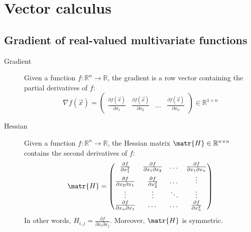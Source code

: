 \chapter{Vector calculus}


\section{Gradient of real-valued multivariate functions}

\begin{description}
    \item[Gradient] 
        Given a function $f: \mathbb{R}^n \rightarrow \mathbb{R}$, 
        the gradient is a row vector containing the partial derivatives of $f$:
        \[ 
            \nabla f(\vec{x}) = 
            \begin{pmatrix}
                \frac{\partial f(\vec{x})}{\partial x_1} & \frac{\partial f(\vec{x})}{\partial x_2} & \dots & \frac{\partial f(\vec{x})}{\partial x_n}
            \end{pmatrix}
            \in \mathbb{R}^{1 \times n}
        \]

    \item[Hessian] 
        Given a function $f: \mathbb{R}^n \rightarrow \mathbb{R}$, 
        the Hessian matrix $\matr{H} \in \mathbb{R}^{n \times n}$ contains the second derivatives of $f$:
        \[
            \matr{H} = 
            \begin{pmatrix}
                \frac{\partial f}{\partial x_1^2}               & \frac{\partial f}{\partial x_1 \partial x_2} & \dots & \frac{\partial f}{\partial x_1 \partial x_n} \\
                \frac{\partial f}{\partial x_2 \partial x_1}    & \frac{\partial f}{\partial x_2^2} & \dots & \vdots \\
                \vdots                                          & \vdots & \ddots & \vdots \\
                \frac{\partial f}{\partial x_n \partial x_1}    & \dots & \dots & \frac{\partial f}{\partial x_n^2}
            \end{pmatrix} 
        \]
        In other words, $H_{i,j} = \frac{\partial f}{\partial x_i \partial x_j}$.
        Moreover, $\matr{H}$ is symmetric.
\end{description}


